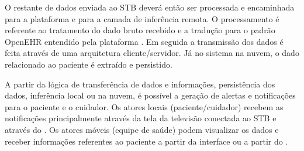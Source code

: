 O restante de dados enviada ao STB deverá então ser processada e encaminhada
para a plataforma \nextsaude[] e para a camada de inferência remota.  O
processamento é referente ao tratamento do dado bruto recebido e a tradução
para o padrão OpenEHR entendido pela plataforma \nextsaude[]. Em seguida a
transmissão dos dados é feita através de uma arquitetura  cliente/servidor. Já
no sistema na nuvem, o dado relacionado ao paciente é extraído e persistido.

A partir da lógica de transferência de dados e informações, persistência
dos dados, inferência local ou na nuvem, é possível a geração de alertas e
notificações para o paciente e o cuidador. Os atores locais (paciente/cuidador) 
recebem as notificações principalmente através da tela da televisão conectada ao 
STB e através do \smartphone. Os atores móveis (equipe de saúde) podem visualizar 
os dados e receber informações referentes ao paciente a partir da interface \web ou 
a partir do \smartphone.


